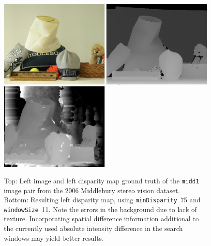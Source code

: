 \documentclass[english, paper=a4]{scrartcl}
\begin{document}
\begin{figure}[H]
\centering
\includegraphics[width=0.49\textwidth]{midd1_left.png}
\label{fig:midd1_left}
\includegraphics[width=0.49\textwidth]{midd1_groundtruth_left.png}
\label{fig:midd1_groundtruth_left}
\includegraphics[width=0.49\textwidth]{midd1_result_left_winsize11_mindisp75.png}
\label{fig:midd1_result_left_winsize11_mindisp75}
\caption{Top: Left image and left disparity map ground truth of the \texttt{midd1} image pair from the 2006 Middlebury stereo vision dataset.\\
Bottom: Resulting left disparity map, using \texttt{minDisparity}~75 and \texttt{windowSize}~11. Note the errors in the background due to lack of texture. Incorporating spatial difference information additional to the currently used absolute intensity difference in the search windows may yield better results.}
\end{figure}


\newpage


%
\end{document}
